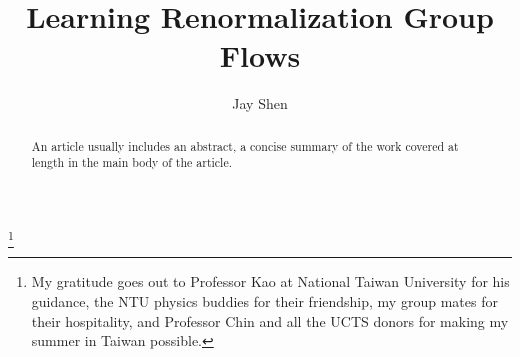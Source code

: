 \documentclass[%
    reprint,
    amsmath,amssymb,
    aps
]{revtex4-2}
\begin{document}

\title{Learning Renormalization Group Flows}

\author{Jay Shen}
\thanks{My gratitude goes out to Professor Kao at National Taiwan University for his guidance, the NTU physics buddies for their friendship, my group mates for their hospitality, and Professor Chin and all the UCTS donors for making my summer in Taiwan possible.}

\begin{abstract}
An article usually includes an abstract, a concise summary of the work
covered at length in the main body of the article. 
\end{abstract}

\maketitle




\end{document}
